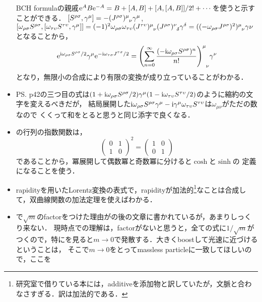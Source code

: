 \begin{itemize}
		BCH formulaの親戚$\mathrm{e}^{A}B\mathrm{e}^{-A} = B + [A, B] + [A, [A, B]]/2!  + \cdots$を使うと示すことができる．
		$[S^{\rho\sigma}, \gamma^{\mu}] = -(J^{\rho\sigma})\indices{^\mu_\nu}\gamma^{\mu}$, 
		$[\omega_{\rho\sigma}S^{\rho\sigma},[\omega_{\tau\upsilon}S^{\tau\upsilon}, \gamma^{\mu}]] \allowbreak = (-1)^2\omega_{\rho\sigma}\omega_{\tau\upsilon}(J^{\tau\upsilon})\indices{^\mu_\nu}(J^{\rho\sigma})\indices{^\nu_\delta}\gamma^{\delta} = ((-\omega_{\rho\sigma}J^{\rho\sigma})^2)\indices{^\mu_\nu}\gamma{\nu}$
		となることから，
		\begin{equation}
			\e^{\i\omega_{\rho\sigma}S^{\rho\sigma}/2}\gamma^{\mu}\e^{-\i\omega_{\tau\sigma}J^{\tau\sigma}/2} = \qty(\sum_{n=0}^{\infty}\frac{(-\i\omega_{\rho\sigma }S^{\rho\sigma})^n}{n!})\indices{^\mu_\nu}\gamma^{\nu}
		\end{equation}
		となり，無限小の合成により有限の変換が成り立っていることがわかる．
	\item PS. p42の三つ目の式は$(1+\mathrm{i}\omega_{\rho\sigma}S^{\rho\sigma}/2)\gamma^{\mu}(1-\mathrm{i}\omega_{\tau\upsilon}S^{\tau\upsilon}/2)$のように縮約の文字を変えるべきだが，
	結局展開した$\mathrm{i}\omega_{\rho\sigma}S^{\rho\sigma}\gamma^{\mu}-\mathrm{i}\gamma^{\mu}\omega_{\tau\upsilon}S^{\tau\upsilon}$は$\omega_{\mu\nu}$がただの数なので
	くくって和をとると思うと同じ添字で良くなる．
	\item {}の行列の指数関数は，
		\begin{equation}
			\begin{pmatrix}
				0 & 1\\
				1 & 0
			\end{pmatrix}^2 = 
			\begin{pmatrix}
				1 & 0\\
				0 &1
			\end{pmatrix}
		\end{equation}
		であることから，冪展開して偶数冪と奇数冪に分けると$\cosh$と$\sinh$の
		定義になることを使う．
	\item rapidityを用いたLorentz変換の表式で，rapidityが加法的\footnote{研究室で借りている本には，additiveを添加物と訳していたが，文脈と合わなさすぎる．訳は加法的である．}なことは合成して，双曲線関数の加法定理を使えばわかる．
	\item {}で$\sqrt{m}$のfactorをつけた理由がの後の文章に書かれているが，あまりしっくり来ない．
		現時点での理解は，factorがないと思うと，全ての式に$1/\sqrt{m}$がつくので，特にを見ると$m\to0$で発散する．大きくboostして光速に近づけるということは，
		そこで$m\to0$をとってmassless particleに一致してほしいので，ここを

\end{itemize}

